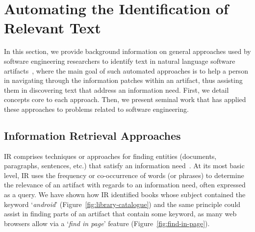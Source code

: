


\section{Automating the Identification of Relevant Text}
\label{cp2:general-approaches}










In this section, we provide background information on general 
approaches used
by software engineering researchers 
to identify text in natural language software artifacts~\cite{Bavota2016},
where the main goal of such automated approaches is to help
 a person in navigating through the
information patches within an artifact,
thus assisting them in discovering
text that address an information need.
First, we detail concepts 
core to each approach. Then, we 
present seminal work that has applied 
these approaches to problems related 
to software engineering.






\subsection{Information Retrieval Approaches}


\acf{IR} comprises techniques
or approaches for finding entities (documents, paragraphs, sentences, etc.)
that satisfy an information need~\cite{manning2010IR}.
At its most basic level, 
\acs{IR}
uses the 
frequency or co-occurrence of words (or phrases) to determine the relevance
of an artifact with regards to an information need, often expressed as a query.
We have shown how \acs{IR} identified
books whose subject contained
the keyword `\textit{android}' (Figure~\ref{fig:library-catalogue})
and the same principle could assist 
in finding parts of an artifact that contain some keyword, 
as many web browsers allow via a `\textit{find in page}' feature (Figure~\ref{fig:find-in-page}).







